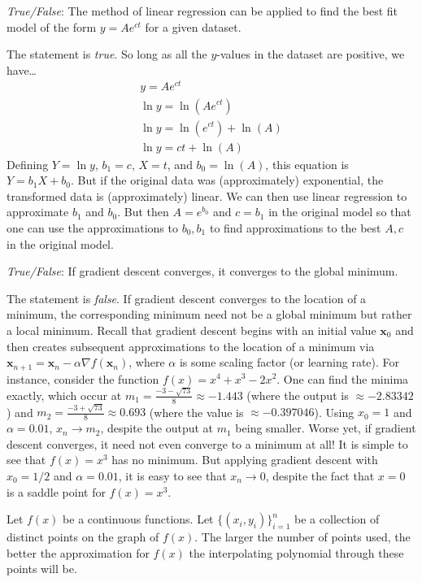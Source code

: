 \documentclass[11pt,letterpaper]{article}
\begin{document}
\quizsol \textit{True/False}: The method of linear regression can be applied to find the best fit model of the form $y= Ae^{ct}$ for a given dataset. \pspace

\sol The statement is \textit{true}. So long as all the $y$-values in the dataset are positive, we have\dots
	\[
	\begin{gathered}
	y= Ae^{ct} \\[0.3cm]
	\ln y = \ln \left( A e^{ct} \right) \\[0.3cm]
	\ln y = \ln \left( e^{ct} \right) + \ln(A) \\[0.3cm]
	\ln y = ct + \ln(A)
	\end{gathered}
	\]
Defining $Y= \ln y$, $b_1= c$, $X= t$, and $b_0= \ln(A)$, this equation is $Y= b_1 X + b_0$. But if the original data was (approximately) exponential, the transformed data is (approximately) linear. We can then use linear regression to approximate $b_1$ and $b_0$. But then $A= e^{b_0}$ and $c= b_1$ in the original model so that one can use the approximations to $b_0, b_1$ to find approximations to the best $A, c$ in the original model. \pvspace{1.3cm}



\quizsol \textit{True/False}: If gradient descent converges, it converges to the global minimum. \pspace

\sol The statement is \textit{false}. If gradient descent converges to the location of a minimum, the corresponding minimum need not be a global minimum but rather a local minimum. Recall that gradient descent begins with an initial value $\mathbf{x}_0$ and then creates subsequent approximations to the location of a minimum via $\mathbf{x}_{n+1}= \mathbf{x}_n - \alpha \nabla f(\mathbf{x}_n)$, where $\alpha$ is some scaling factor (or learning rate). For instance, consider the function $f(x)= x^4 + x^3 - 2x^2$. One can find the minima exactly, which occur at $m_1= \frac{-3 - \sqrt{73}}{8} \approx -1.443$ (where the output is $\approx -2.83342$) and $m_2= \frac{-3 + \sqrt{73}}{8} \approx 0.693$ (where the value is $\approx -0.397046$). Using $x_0= 1$ and $\alpha= 0.01$, $x_n \to m_2$, despite the output at $m_1$ being smaller. Worse yet, if gradient descent converges, it need not even converge to a minimum at all! It is simple to see that $f(x)= x^3$ has no minimum. But applying gradient descent with $x_0= 1/2$ and $\alpha= 0.01$, it is easy to see that $x_n \to 0$, despite the fact that $x= 0$ is a saddle point for $f(x)= x^3$. 









Let $f(x)$ be a continuous functions. Let $\{ (x_i, y_i) \}_{i=1}^n$ be a collection of distinct points on the graph of $f(x)$. The larger the number of points used, the better the approximation for $f(x)$ the interpolating polynomial through these points will be. 
\end{document}
